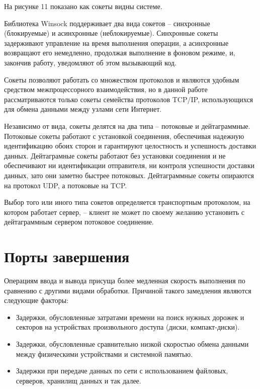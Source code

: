 \documentclass[a4paper, 12pt]{report}		%
\begin{document}
На рисунке 11 показано как сокеты видны системе.

Библиотека Winsock поддерживает два вида сокетов -- синхронные (блокируемые) и асинхронные (неблокируемые). Синхронные сокеты задерживают управление на время выполнения операции, а асинхронные возвращают его немедленно, продолжая выполнение в фоновом режиме, и, закончив работу, уведомляют об этом вызывающий код.

Сокеты позволяют работать со множеством протоколов и являются удобным средством межпроцессорного взаимодействия\cite{Sharygin}, но в данной работе рассматриваются только сокеты семейства протоколов TCP/IP, использующихся для обмена данными между узлами сети Интернет.

Независимо от вида, сокеты делятся на два типа -- потоковые и дейтаграммные. Потоковые сокеты работают с установкой соединения, обеспечивая надежную идентификацию обоих сторон и гарантируют целостность и успешность доставки данных. Дейтаграмные сокеты работают без установки соединения и не обеспечивают ни идентификации отправителя, ни контроля успешности доставки данных, зато они заметно быстрее потоковых. Дейтаграммные сокеты опираются на протокол UDP, а потоковые на TCP.

Выбор того или иного типа сокетов определяется транспортным протоколом, на котором работает сервер, -- клиент не может по своему желанию установить с дейтаграммным сервером потоковое соединение.

\chapter*{Порты завершения}

Операциям ввода и вывода присуща более медленная скорость выполнения по сравнению с другими видами обработки. Причиной такого замедления являются следующие факторы\cite{Berdnikov}:

\begin{itemize}
\item Задержки, обусловленные затратами времени на поиск нужных дорожек и секторов на устройствах произвольного доступа (диски, компакт-диски).

\item Задержки, обусловленные сравнительно низкой скоростью обмена данными между физическими устройствами и системной памятью.

\item Задержки при передаче данных по сети с использованием файловых, серверов, хранилищ данных и так далее.
\end{itemize}
\end{document}
